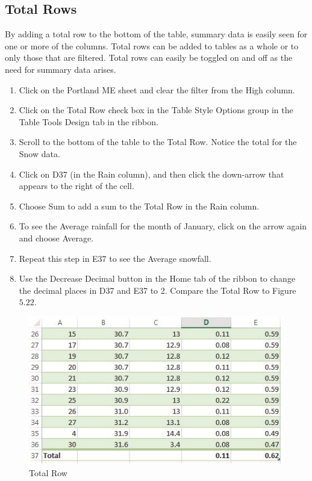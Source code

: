 \subsection{Total Rows}

By adding a total row to the bottom of the table, summary data is easily seen for one or more of the columns. Total rows can be added to tables as a whole or to only those that are filtered. Total rows can easily be toggled on and off as the need for summary data arises.

\begin{enumerate}
	\item Click on the Portland ME sheet and clear the filter from the High column.
	\item Click on the Total Row check box in the Table Style Options group in the Table Tools Design tab in the ribbon.
	\item Scroll to the bottom of the table to the Total Row. Notice the total for the Snow data.
	\item Click on D37 (in the Rain column), and then click the down-arrow that appears to the right of the cell.
	\item Choose Sum to add a sum to the Total Row in the Rain column.
	\item To see the Average rainfall for the month of January, click on the arrow again and choose Average.
	\item Repeat this step in E37 to see the Average snowfall.
	\item Use the Decrease Decimal button in the Home tab of the ribbon to change the decimal places in D37 and E37 to 2. Compare the Total Row to Figure $ 5.22 $.
\end{enumerate}

\begin{figure}[H]
	\centering
	\includegraphics[width=\maxwidth{.95\linewidth}]{gfx/ch05_fig22}
	\caption{Total Row}
	\label{05:fig22}
\end{figure}

